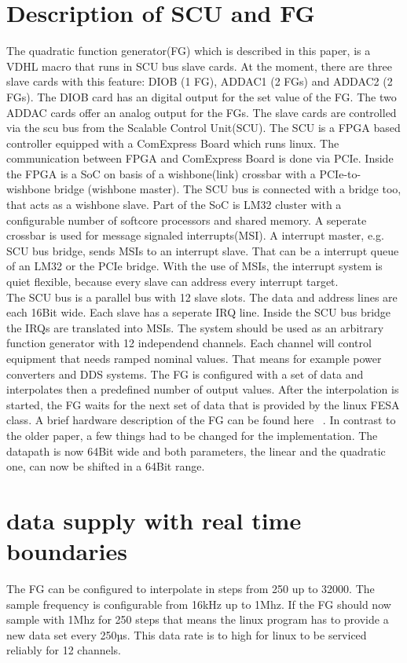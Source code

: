 \documentclass[a4paper,
              ]{jacow}
\begin{document}
\section{Description of SCU and FG}
The quadratic function generator(FG) which is described in this paper, is a VDHL macro that runs in SCU bus slave cards. At the moment, there are three slave cards with this feature: DIOB (1 FG), ADDAC1 (2 FGs) and ADDAC2 (2 FGs). The DIOB card has an digital output for the set value of the FG. The two ADDAC cards offer an analog output for the FGs. The slave cards are
controlled via the scu bus from the Scalable Control Unit(SCU). The SCU is a FPGA based controller equipped with a ComExpress Board which runs linux. The communication between FPGA and ComExpress Board is done   via PCIe. Inside the FPGA is a SoC on basis of a wishbone(link) crossbar with a PCIe-to-wishbone bridge (wishbone master). The SCU bus is connected with a bridge too, that acts as a wishbone slave. Part of the SoC is LM32 cluster with a configurable number of softcore processors and shared memory. A seperate crossbar is used for message signaled interrupts(MSI). A interrupt master, e.g. SCU bus bridge, sends MSIs to an interrupt slave. That can be a interrupt queue of an LM32 or the PCIe bridge. With the use of MSIs, the interrupt system is quiet flexible, because every slave can address every interrupt target.\\
The SCU bus is a parallel bus with 12 slave slots. The data and address lines are each 16Bit wide. Each slave has a seperate IRQ line. Inside the SCU bus bridge the IRQs are translated into MSIs.
The system should be used as an arbitrary function generator with 12 independend channels. Each channel will control equipment that needs ramped nominal values. That means for example  power converters and DDS systems.
The FG is configured with a set of data and interpolates then a predefined number of output values. After the interpolation is started, the FG waits for the next set of data that
is provided by the linux FESA class. A brief hardware description of the FG can be found here ~\cite{ref_fg_paper}. In contrast to the older paper, a few things had to be changed for the implementation.
The datapath is now 64Bit wide and both parameters, the linear and the quadratic one, can now be shifted in a 64Bit range. 


\section{data supply with real time boundaries}
The FG can be configured to interpolate in steps from 250 up to 32000. The sample frequency is configurable from 16kHz up to 1Mhz. If the FG should now sample with 1Mhz for 250 steps
that means the linux program has to provide a new data set every 250µs. This data rate is to high for linux to be serviced reliably for 12 channels.
\end{document}
